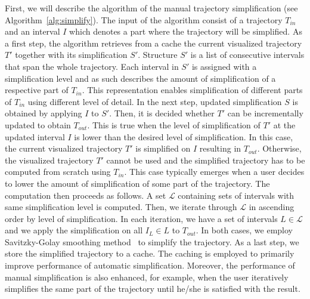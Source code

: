 First, we will describe the algorithm of the manual trajectory simplification (see Algorithm~\ref{alg:simplify}).
The input of the algorithm consist of a trajectory $T_{in}$ and an interval $I$ which denotes a part where the trajectory will be simplified.
As a first step, the algorithm retrieves from a cache the current visualized trajectory $T'$ together with its simplification $S'$.
Structure $S'$ is a list of consecutive intervals that span the whole trajectory.
Each interval in $S'$ is assigned with a simplification level and as such describes the amount of simplification of a respective part of $T_{in}$.
This representation enables simplification of different parts of $T_{in}$ using different level of detail.
In the next step, updated simplification $S$ is obtained by applying $I$ to $S'$.
Then, it is decided whether $T'$ can be incrementally updated to obtain $T_{out}$.
This is true when the level of simplification of $T'$ at the updated interval $I$ is lower than the desired level of simplification.
In this case, the current visualized trajectory $T'$ is simplified on $I$ resulting in $T_{out}$.
Otherwise, the visualized trajectory $T'$ cannot be used and the simplified trajectory has to be computed from scratch using $T_{in}$.
This case typically emerges when a user decides to lower the amount of simplification of some part of the trajectory.
The computation then proceeds as follows.
A set $\mathcal{L}$ containing sets of intervals with same simplification level is computed.
Then, we iterate through $\mathcal{L}$ in ascending order by level of simplification.
In each iteration, we have a set of intervals $L \in \mathcal{L}$ and we apply the simplification on all $I_L \in L$ to $T_{out}$.
In both cases, we employ Savitzky-Golay smoothing method~\cite{savitzky1964smoothing} to simplify the trajectory.
As a last step, we store the simplified trajectory to a cache.
The caching is employed to primarily improve performance of automatic simplification.
Moreover, the performance of manual simplification is also enhanced, for example, when the user iteratively simplifies the same part of the trajectory until he/she is satisfied with the result.

